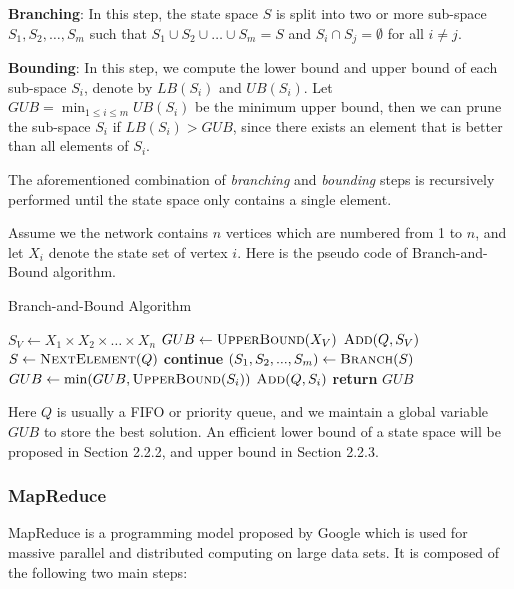 \noindent \textbf{Branching}: In this step, the state space $S$ is split into two or more sub-space $S_1,S_2,\dots,S_m$ such that $S_1\cup S_2\cup\dots\cup S_m=S$ and $S_i\cap S_j=\emptyset$ for all $i\neq j$.

\noindent \textbf{Bounding}: In this step, we compute the lower bound and upper bound of each sub-space $S_i$, denote by $LB(S_i)$ and $UB(S_i)$. Let $GUB=\min_{1\le i\le m}UB(S_i)$ be the minimum upper bound, then we can prune the sub-space $S_i$ if $LB(S_i)>GUB$, since there exists an element that is better than all elements of $S_i$.

The aforementioned combination of \textit{branching} and \textit{bounding} steps is recursively performed until the state space only contains a single element.

Assume we the network contains $n$ vertices which are numbered from 1 to $n$, and let $X_i$ denote the state set of vertex $i$. Here is the pseudo code of Branch-and-Bound algorithm.

\begin{algorithm}[!h]
\caption{Branch-and-Bound Algorithm}
\begin{algorithmic}[1]
    \State $S_V \gets X_1\times X_2\times\dots\times X_n$
    \State $GUB \gets \textsc{UpperBound}(X_V)$
    \State $\textsc{Add}(Q, S_V)$
        \State $S \gets \textsc{NextElement}(Q)$
            \State \textbf{continue}
        \EndIf
        \State $(S_1,S_2,...,S_m) \gets \textsc{Branch}(S)$
            \State $GUB \gets \min(GUB, \textsc{UpperBound}(S_i))$
        \EndFor
                \State $\textsc{Add}(Q, S_i)$
            \EndIf
        \EndFor
    \EndWhile
    \State \textbf{return }$GUB$
\EndFunction
\end{algorithmic}
\end{algorithm}

Here $Q$ is usually a FIFO or priority queue, and we maintain a global variable $GUB$ to store the best solution. An efficient lower bound of a state space will be proposed in Section 2.2.2, and upper bound in Section 2.2.3.

\subsubsection{MapReduce}
MapReduce is a programming model proposed by Google which is used for massive parallel and distributed computing on large data sets. It is composed of the following two main steps:

